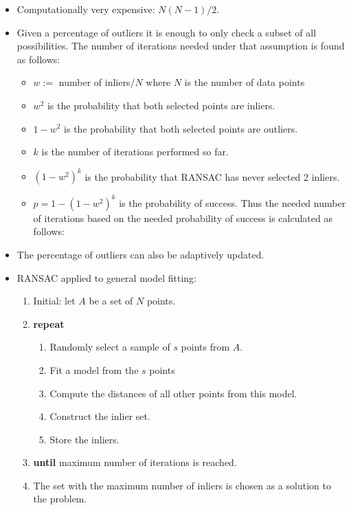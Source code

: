 \documentclass[10pt,a4paper]{scrartcl}
\begin{document}
\begin{multicols*}{2}
\begin{itemize}
\item Computationally very expensive: $N(N-1)/2$.
\item Given a percentage of outliers it is enough to only check a subset of all possibilities. The number of iterations needed under that assumption is found as follows:
\begin{itemize}
\item $w:=$ number of inliers$/N$ where $N$ is the number of data points
\item $w^2$ is the probability that both selected points are inliers.
\item $1-w^2$ is the probability that both selected points are outliers.
\item $k$ is the number of iterations performed so far.
\item $(1-w^2)^k$ is the probability that RANSAC has never selected 2 inliers.
\item $p = 1-(1-w^2)^k$ is the probability of success. Thus the needed number of iterations based on the needed probability of success is calculated as follows:
\end{itemize}
\item The percentage of outliers can also be adaptively updated.
\item RANSAC applied to general model fitting:
\begin{enumerate}
\item Initial: let $A$ be a set of $N$ points.
\item \textbf{repeat}
\begin{enumerate}
\item Randomly select a sample of $s$ points from $A$.
\item Fit a model from the $s$ points
\item Compute the distances of all other points from this model.
\item Construct the inlier set.
\item Store the inliers.
\end{enumerate}
\item \textbf{until} maximum number of iterations is reached.
\item The set with the maximum number of inliers is chosen as a solution to the problem.

\end{enumerate}
\end{itemize}


\end{multicols*}
\end{document}
